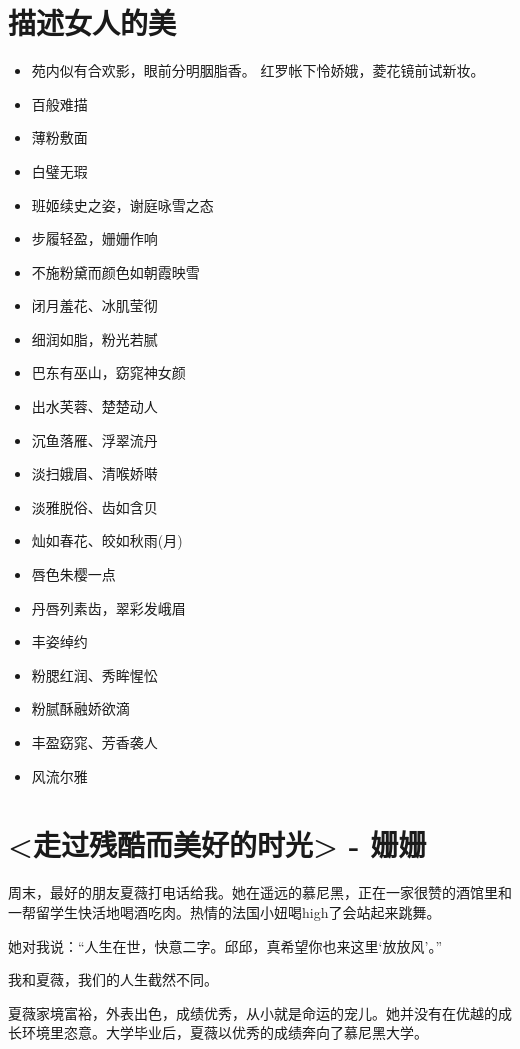 \documentclass[UTF8,a4paper,8pt]{ctexbook}
\begin{document}
\section{描述女人的美}
	\begin{itemize}
		\item 苑内似有合欢影，眼前分明胭脂香。 红罗帐下怜娇娥，菱花镜前试新妆。
		\item 百般难描
		\item 薄粉敷面
		\item 白璧无瑕
		\item 班姬续史之姿，谢庭咏雪之态 
		\item 步履轻盈，姗姗作响
		\item 不施粉黛而颜色如朝霞映雪
		\item 闭月羞花、冰肌莹彻
		\item 细润如脂，粉光若腻
		\item 巴东有巫山，窈窕神女颜
		\item 出水芙蓉、楚楚动人
		\item 沉鱼落雁、浮翠流丹
		\item 淡扫娥眉、清喉娇啭
		\item 淡雅脱俗、齿如含贝
		\item 灿如春花、皎如秋雨(月)
		\item 唇色朱樱一点
		\item 丹唇列素齿，翠彩发峨眉
		\item 丰姿绰约
		\item 粉腮红润、秀眸惺忪
		\item 粉腻酥融娇欲滴
		\item 丰盈窈窕、芳香袭人
		\item 风流尔雅
	\end{itemize}


\newpage

\section{<走过残酷而美好的时光> - 姗姗}
	 周末，最好的朋友夏薇打电话给我。她在遥远的慕尼黑，正在一家很赞的酒馆里和一帮留学生快活地喝酒吃肉。热情的法国小妞喝high了会站起来跳舞。
	 
	 她对我说：“人生在世，快意二字。邱邱，真希望你也来这里‘放放风’。”
	 
	 我和夏薇，我们的人生截然不同。
	 
	 夏薇家境富裕，外表出色，成绩优秀，从小就是命运的宠儿。她并没有在优越的成长环境里恣意。大学毕业后，夏薇以优秀的成绩奔向了慕尼黑大学。
	 
\end{document}

